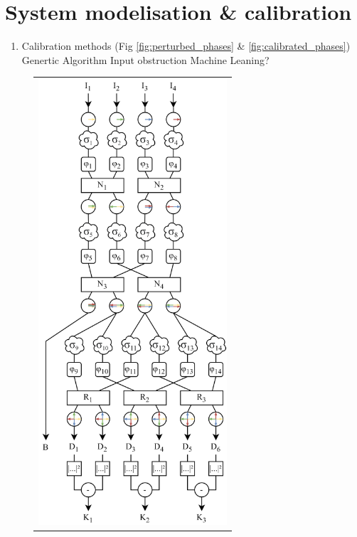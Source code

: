 \documentclass{aa}
\begin{document}
\section{System modelisation \& calibration}
    \begin{enumerate}
        \item Calibration methods (Fig \ref{fig:perturbed_phases} \& \ref{fig:calibrated_phases})
        \subitem Genertic Algorithm
        \subitem Input obstruction
        \subitem Machine Leaning?
    \end{enumerate}

    \begin{figure}
        \begin{center}
        \begin{tabular}{c}
        \includegraphics[width=7cm]{img/kernel_scheme.png}
        \end{tabular}
        \end{center}
        \caption[architecture] 
        { \label{fig:architecture} 
}
\end{figure}
\end{document}
